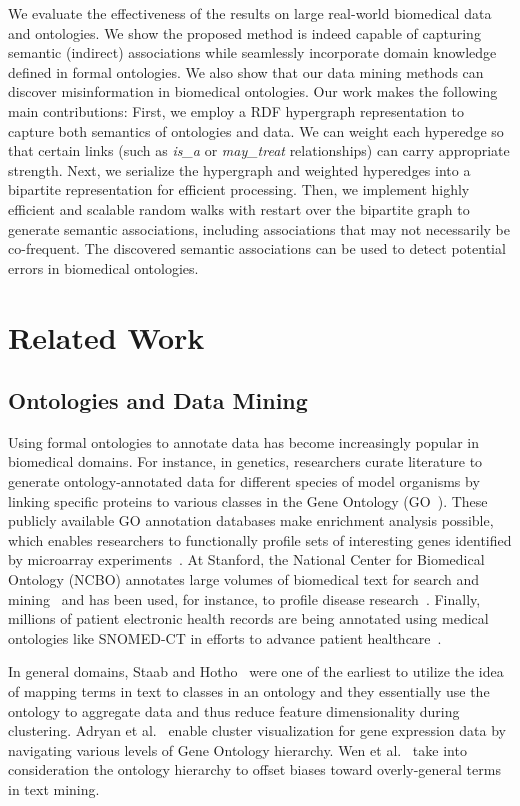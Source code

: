We evaluate the effectiveness of the results on large real-world biomedical data and ontologies. We show the proposed method is indeed capable of capturing semantic (indirect) associations while seamlessly incorporate domain knowledge defined in formal ontologies. We also show that our data mining methods can discover misinformation in biomedical ontologies. Our work makes the following main contributions: First, we employ a RDF hypergraph representation to capture both semantics of ontologies and data. We can weight each hyperedge so that certain links (such as \emph{is\_a} or \emph{may\_treat} relationships) can carry appropriate strength.  Next, we serialize the hypergraph and weighted hyperedges into a bipartite representation for efficient processing. Then, we implement highly efficient and scalable random walks with restart over the bipartite graph to generate semantic associations, including associations that may not necessarily be co-frequent. The discovered semantic associations can be used to detect potential errors in biomedical ontologies.


\section{Related Work}
\subsection{Ontologies and Data Mining}
Using formal ontologies to annotate data has become increasingly popular in biomedical domains. For instance, in genetics, researchers curate literature to generate ontology-annotated data for different species of model organisms by linking specific proteins to various classes in the Gene Ontology (GO~\cite{GO}). These publicly available GO annotation databases make enrichment analysis possible, which enables researchers to functionally profile sets of interesting genes identified by microarray experiments~\cite{Khatri2005}.  At Stanford, the National Center for Biomedical Ontology (NCBO) annotates large volumes of biomedical text for search and mining~\cite{RI} and has been used, for instance, to profile disease research~\cite{Liu2012}.  Finally, millions of patient electronic health records are being annotated using medical ontologies like SNOMED-CT in efforts to advance patient healthcare~\cite{OMOP}.

In general domains, Staab and Hotho~\cite{StaabH03} were one of the earliest to utilize the idea of mapping terms in text to classes in an ontology and they essentially use the ontology to aggregate data and thus reduce feature dimensionality during clustering.  Adryan et al.~\cite{Adryan2004} enable cluster visualization for gene expression data by navigating various levels of Gene Ontology hierarchy.  %
Wen et al.~\cite{Wen2007Ont} take into consideration the ontology hierarchy to offset biases toward overly-general terms in text mining.

